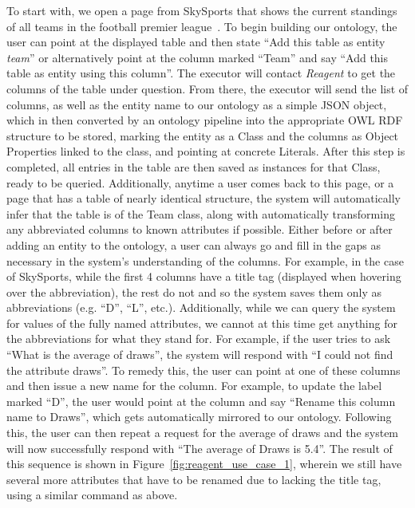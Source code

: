 To start with, we open a page from SkySports that shows the current standings
of all teams in the football premier league~\cite{skysports_table}. To begin building
our ontology, the user can point at the displayed table and then state ``Add this table
as entity {\em team}'' or alternatively point at the column marked ``Team'' and say ``Add this
table as entity using this column''. The executor will contact \textit{Reagent} to get the columns
of the table under question. From there, the executor will send the list of columns, as well
as the entity name to our ontology as a simple JSON object, which in then converted by an
ontology pipeline into the appropriate OWL RDF structure to be stored, marking the entity as a 
Class and the columns as Object Properties linked to the class, and pointing at concrete 
Literals. After this step is completed, all entries in the table are then saved as instances
for that Class, ready to be queried. Additionally, anytime a user comes back to this page,
or a page that has a table of nearly identical structure, the system will automatically infer that the table
is of the Team class, along with automatically transforming any abbreviated columns to known
attributes if possible. Either before or after adding an entity to the ontology, a user can always go and
fill in the gaps as necessary in the system's understanding of the columns. For example, in the case of 
SkySports, while the first 4 columns have a title tag (displayed when hovering over the abbreviation), 
the rest do not and so the system saves them only as abbreviations (e.g. ``D'', ``L'', etc.). 
Additionally, while we can query the system for values of the fully named attributes, we cannot at this
time get anything for the abbreviations for what they stand for. For example, if the user
tries to ask ``What is the average of draws'', the system will respond with 
``I could not find the attribute draws''. To remedy this, the user can point at one of these
columns and then issue a new name for the column. For example, to update the
label marked ``D'', the user would point at the column and say ``Rename this column
name to Draws'', which gets automatically mirrored to our
ontology. Following this, the user can then repeat a request for the
average of draws and the system will now successfully respond with ``The average of Draws is 5.4''. The result of this sequence is shown in Figure~\ref{fig:reagent_use_case_1}, wherein we still have several more attributes that
have to be renamed due to lacking the title tag, using a similar command as
above.

